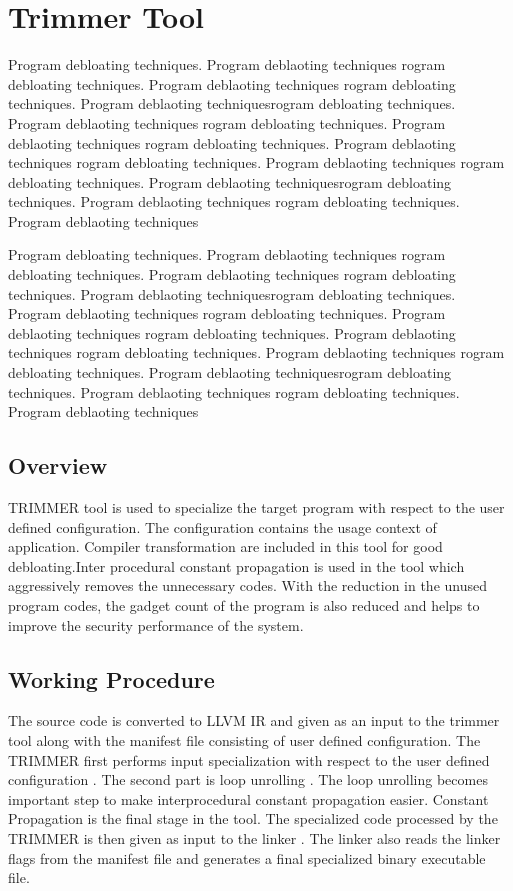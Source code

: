 \documentclass{relatorio}
\begin{document}
\section{Trimmer Tool}%
\label{Tools}

Program debloating techniques. Program deblaoting techniques rogram debloating techniques. Program deblaoting techniques
rogram debloating techniques. Program deblaoting techniquesrogram debloating techniques. Program deblaoting techniques
rogram debloating techniques. Program deblaoting techniques rogram debloating techniques. Program deblaoting techniques
rogram debloating techniques. Program deblaoting techniques 
rogram debloating techniques. Program deblaoting techniquesrogram debloating techniques. Program deblaoting techniques
rogram debloating techniques. Program deblaoting techniques

Program debloating techniques. Program deblaoting techniques rogram debloating techniques. Program deblaoting techniques
rogram debloating techniques. Program deblaoting techniquesrogram debloating techniques. Program deblaoting techniques
rogram debloating techniques. Program deblaoting techniques rogram debloating techniques. Program deblaoting techniques
rogram debloating techniques. Program deblaoting techniques 
rogram debloating techniques. Program deblaoting techniquesrogram debloating techniques. Program deblaoting techniques
rogram debloating techniques. Program deblaoting techniques

\subsection{Overview}%
\label{Tools}
TRIMMER tool is used to specialize the target program with respect to the user defined configuration. The configuration contains the usage context of application. Compiler transformation are included in this tool for good debloating.Inter procedural  constant propagation is used in the tool which aggressively removes the unnecessary codes. With the reduction in the unused program codes, the gadget count of the program is also reduced and helps to improve the security performance of the system. 

\subsection{Working Procedure}%
\label{Tools}

The source code is converted to LLVM IR  and given as an input to the trimmer tool along with the manifest file consisting of user defined configuration. The TRIMMER first performs input specialization with respect to the user defined configuration . The second part is loop unrolling . The loop unrolling becomes important step to make interprocedural constant propagation easier. Constant Propagation is the final stage in the tool. The specialized code processed by the TRIMMER is then given as input to the linker . The linker also reads the linker flags from the manifest file and generates a final specialized binary executable file.
\end{document}
